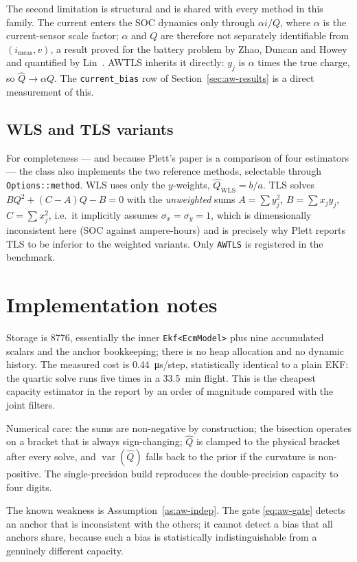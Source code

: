 The second limitation is structural and is shared with every method in this family.  The current
enters the SOC dynamics only through $\alpha i/Q$, where $\alpha$ is the current-sensor scale
factor; $\alpha$ and $Q$ are therefore not separately identifiable from $(i_\text{meas},v)$, a
result proved for the battery problem by Zhao, Duncan and Howey~\cite{zhao2017observability} and
quantified by Lin~\cite{lin2018sensorbias}.  AWTLS inherits it directly: $y_j$ is
$\alpha$ times the true charge, so $\hat Q\to\alpha Q$.  The \texttt{current\_bias} row of
Section~\ref{sec:aw-results} is a direct measurement of this.

\subsection{WLS and TLS variants}
For completeness --- and because Plett's paper is a comparison of four estimators --- the class also
implements the two reference methods, selectable through \texttt{Options::method}.
WLS uses only the $y$-weights, $\hat Q_\text{WLS}=b/a$.  TLS solves
$BQ^2+(C-A)Q-B=0$ with the \emph{unweighted} sums $A=\sum y_j^2$, $B=\sum x_jy_j$,
$C=\sum x_j^2$, i.e.\ it implicitly assumes $\sigma_x=\sigma_y=1$, which is dimensionally
inconsistent here (SOC against ampere-hours) and is precisely why Plett reports TLS to be inferior
to the weighted variants.  Only \texttt{AWTLS} is registered in the benchmark.

\section{Implementation notes}
Storage is \SI{8776}{\byte}, essentially the inner \texttt{Ekf<EcmModel>} plus nine accumulated
scalars and the anchor bookkeeping; there is no heap allocation and no dynamic history.  The
measured cost is \SI{0.44}{\micro\second}/step, statistically identical to a plain EKF: the quartic
solve runs five times in a \SI{33.5}{\minute} flight.  This is the cheapest capacity estimator in
the report by an order of magnitude compared with the joint filters.

Numerical care: the sums are non-negative by construction; the bisection operates on a bracket that
is always sign-changing; $\hat Q$ is clamped to the physical bracket after every solve, and
$\operatorname{var}(\hat Q)$ falls back to the prior if the curvature is non-positive.  The
single-precision build reproduces the double-precision capacity to four digits.

The known weakness is Assumption~\ref{as:aw-indep}.  The gate \eqref{eq:aw-gate} detects an anchor
that is inconsistent with the others; it cannot detect a bias that all anchors share, because such a
bias is statistically indistinguishable from a genuinely different capacity.

